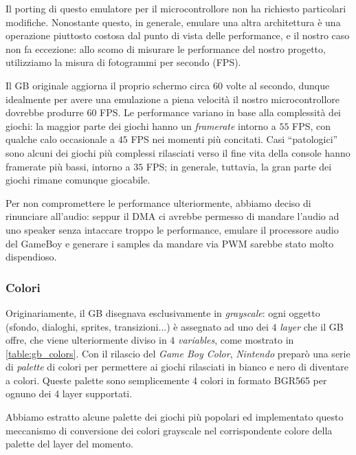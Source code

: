 \documentclass[hidelinks,12pt]{article}
\begin{document}
Il porting di questo emulatore per il microcontrollore non ha richiesto
particolari modifiche. Nonostante questo, in generale,  emulare una altra
architettura è una operazione piuttosto costosa dal punto di vista delle
performance, e il nostro caso non fa eccezione: allo scomo di misurare le
performance del nostro progetto, utilizziamo la misura di fotogrammi
per secondo (FPS). 

Il GB originale aggiorna il proprio schermo circa 60 volte al secondo, dunque
idealmente per avere una emulazione a piena velocità il nostro microcontrollore
dovrebbe produrre $60$ FPS. Le performance variano in base alla complessità dei
giochi: la maggior parte dei giochi hanno un \textit{framerate} intorno a $55$
FPS, con qualche calo occasionale a $45$ FPS nei momenti più concitati.
Casi ``patologici'' sono alcuni dei giochi più complessi rilasciati verso il
fine vita della console hanno framerate più bassi, intorno a $35$ FPS; 
in generale, tuttavia, la gran parte dei giochi rimane comunque giocabile. 

Per non compromettere le performance ulteriormente, abbiamo deciso di rinunciare
all'audio: seppur il DMA ci avrebbe permesso di mandare l'audio ad uno speaker
senza intaccare troppo le performance, emulare il processore audio del GameBoy e
generare i samples da mandare via PWM sarebbe stato molto dispendioso.

\subsubsection{Colori}
Originariamente, il GB disegnava esclusivamente in \textit{grayscale}: ogni
oggetto (sfondo, dialoghi, sprites, transizioni...) è assegnato ad uno dei $4$
\textit{layer} che il GB offre, che viene ulteriormente diviso in $4$
\textit{variables}, come mostrato in \cref{table:gb_colors}.
Con il rilascio del \textit{Game Boy Color}, \textit{Nintendo} preparò una serie
di \textit{palette} di colori per permettere ai giochi rilasciati in bianco e nero
di diventare a colori. Queste palette sono semplicemente 4 colori in formato BGR565
per ognuno dei 4 layer supportati.

Abbiamo estratto alcune palette dei giochi più popolari ed implementato questo
meccanismo di conversione dei colori grayscale nel corrispondente colore della
palette del layer del momento.
\end{document}
